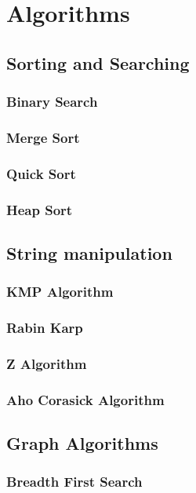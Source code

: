 \documentclass[10pt,landscape,twocolumn]{article}
\begin{document}
\section{Algorithms}

\subsection{Sorting and Searching}

\subsubsection{Binary Search}
\subsubsection{Merge Sort}
\subsubsection{Quick Sort}
\subsubsection{Heap Sort}

\subsection{String manipulation}
\subsubsection{KMP Algorithm}
\subsubsection{Rabin Karp}
\subsubsection{Z Algorithm}
\subsubsection{Aho Corasick Algorithm}

\subsection{Graph Algorithms}
\subsubsection{Breadth First Search}
\end{document}
